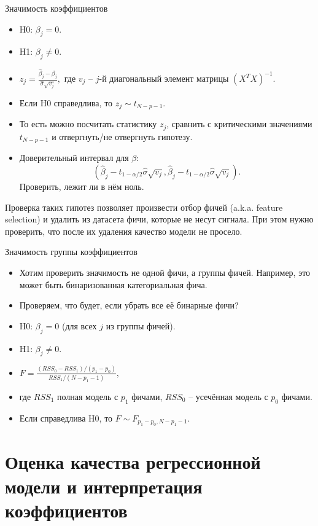 \documentclass[9pt]{beamer}
\begin{document}
\begin{frame}{Значимость коэффициентов}
    \begin{itemize}
        \item H0: $\beta_j = 0$.
        \item H1: $\beta_j \neq 0$.
        \item $z_j = \frac{\hat\beta_j - \beta_j}{\hat\sigma\sqrt{v_j}},$ где $v_j$ – $j$-й диагональный элемент матрицы $(X^TX)^{-1}$.
        \item Если H0 справедлива, то $z_j\sim t_{N-p-1}$.
        \item То есть можно посчитать статистику $z_j$, сравнить с критическими значениями $t_{N-p-1}$ и отвергнуть/не отвергнуть гипотезу.
        \item Доверительный интервал для $\beta$: $$(\hat\beta_j - t_{1-\alpha/2}\hat\sigma\sqrt{v_j}, \hat\beta_j - t_{1-\alpha/2}\hat\sigma\sqrt{v_j}).$$ Проверить, лежит ли в нём ноль.
    \end{itemize}
    Проверка таких гипотез позволяет произвести отбор фичей (a.k.a. feature selection) и удалить из датасета фичи, которые не несут сигнала. При этом нужно проверить, что после их удаления качество модели не просело.
\end{frame}

\begin{frame}{Значимость группы коэффициентов}
    \begin{itemize}
        \item Хотим проверить значимость не одной фичи, а группы фичей. Например, это может быть бинаризованная категориальная фича.
        \item Проверяем, что будет, если убрать все её бинарные фичи?
        \item H0: $\beta_j = 0$ (для всех $j$ из группы фичей).
        \item H1: $\beta_j \neq 0$.
        \item $F=\frac{(RSS_0 - RSS_1)/(p_1-p_0)}{RSS_1/(N-p_1-1)},$
        \item где $RSS_1$ полная модель с $p_1$ фичами, $RSS_0$ – усечённая модель с $p_0$ фичами.
        \item Если справедлива H0, то $F\sim F_{p_1-p_0, N-p_1-1}$.
    \end{itemize}
\end{frame}

\section{Оценка качества регрессионной модели и интерпретация коэффициентов}
\end{document}
